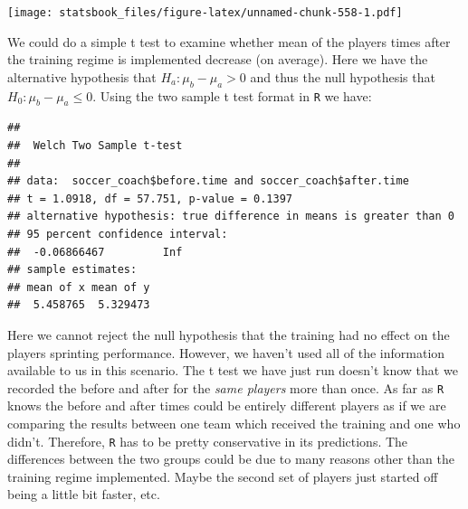 \documentclass[
]{book}
\newenvironment{Shaded}{\begin{snugshade}}{\end{snugshade}}
\newcommand{\AttributeTok}[1]{\textcolor[rgb]{0.77,0.63,0.00}{#1}}
\newcommand{\FunctionTok}[1]{\textcolor[rgb]{0.00,0.00,0.00}{#1}}
\newcommand{\NormalTok}[1]{#1}
\newcommand{\SpecialCharTok}[1]{\textcolor[rgb]{0.00,0.00,0.00}{#1}}
\newcommand{\StringTok}[1]{\textcolor[rgb]{0.31,0.60,0.02}{#1}}
\theoremstyle{definition}
\theoremstyle{definition}
\theoremstyle{definition}
\theoremstyle{definition}
\theoremstyle{remark}
\begin{document}
\begin{Shaded}
\end{Shaded}

\texttt{[image: statsbook\_files/figure-latex/unnamed-chunk-558-1.pdf]}

We could do a simple t test to examine whether mean of the players times after the training regime is implemented decrease (on average). Here we have the alternative hypothesis that \(H_a: \mu_b-\mu_a>0\) and thus the null hypothesis that \(H_0: \mu_b-\mu_a \leq 0\). Using the two sample t test format in \texttt{R} we have:

\begin{Shaded}
\end{Shaded}

\begin{verbatim}
## 
##  Welch Two Sample t-test
## 
## data:  soccer_coach$before.time and soccer_coach$after.time
## t = 1.0918, df = 57.751, p-value = 0.1397
## alternative hypothesis: true difference in means is greater than 0
## 95 percent confidence interval:
##  -0.06866467         Inf
## sample estimates:
## mean of x mean of y 
##  5.458765  5.329473
\end{verbatim}

Here we cannot reject the null hypothesis that the training had no effect on the players sprinting performance. However, we haven't used all of the information available to us in this scenario. The t test we have just run doesn't know that we recorded the before and after for the \emph{same players} more than once. As far as \texttt{R} knows the before and after times could be entirely different players as if we are comparing the results between one team which received the training and one who didn't. Therefore, \texttt{R} has to be pretty conservative in its predictions. The differences between the two groups could be due to many reasons other than the training regime implemented. Maybe the second set of players just started off being a little bit faster, etc.
\end{document}
